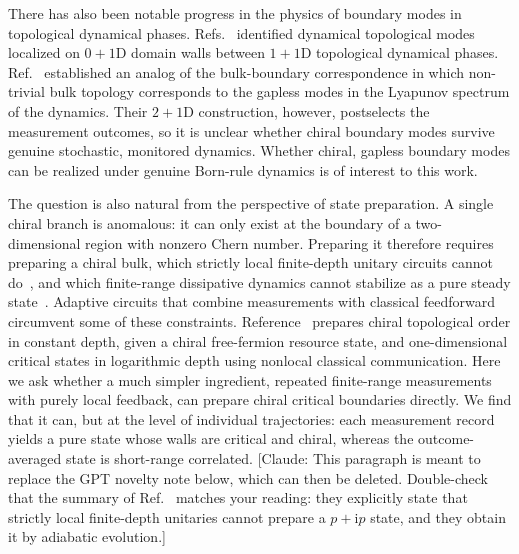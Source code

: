 \documentclass[aps,prb,10pt,twocolumn,superscriptaddress,longbibliography,floatfix]{revtex4-2}
\newcommand{\ii}{\mathrm{i}}
\newcommand{\claudeadd}[1]{{\color{orange}#1}}
\newcommand{\claudecom}[1]{{\color{ForestGreen}[Claude: #1]}}
\begin{document}
There has also been notable progress in the physics of boundary modes in topological dynamical phases.  Refs.~\cite{PanShapourianJian2025, Oshima2025} identified dynamical topological modes localized on $0+1$D domain walls between $1+1$D topological dynamical phases. Ref.~\cite{XiaoKawabata2026}
established an analog of the bulk-boundary correspondence in which non-trivial bulk topology corresponds to the gapless modes in the Lyapunov spectrum of the dynamics. Their $2+1$D construction, however, postselects the measurement outcomes, so it is unclear whether chiral boundary modes survive genuine stochastic, monitored dynamics. Whether chiral, gapless boundary modes can be realized under genuine Born-rule dynamics is of interest to this work.

\claudeadd{The question is also natural from the perspective of state preparation. A single chiral branch is anomalous: it can only exist at the boundary of a two-dimensional region with nonzero Chern number. Preparing it therefore requires preparing a chiral bulk, which strictly local finite-depth unitary circuits cannot do~\cite{LuLessaKimHsieh2022}, and which finite-range dissipative dynamics cannot stabilize as a pure steady state~\cite{BardynEtAl2013,BudichZollerDiehl2015,Goldstein2019}. Adaptive circuits that combine measurements with classical feedforward circumvent some of these constraints. Reference~\cite{LuLessaKimHsieh2022} prepares chiral topological order in constant depth, given a chiral free-fermion resource state, and one-dimensional critical states in logarithmic depth using nonlocal classical communication. Here we ask whether a much simpler ingredient, repeated finite-range measurements with purely local feedback, can prepare chiral critical boundaries directly. We find that it can, but at the level of individual trajectories: each measurement record yields a pure state whose walls are critical and chiral, whereas the outcome-averaged state is short-range correlated.}
\claudecom{This paragraph is meant to replace the GPT novelty note below, which can then be deleted. Double-check that the summary of Ref.~\cite{LuLessaKimHsieh2022} matches your reading: they explicitly state that strictly local finite-depth unitaries cannot prepare a $p+\ii p$ state, and they obtain it by adiabatic evolution.}
\end{document}
